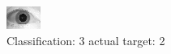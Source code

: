 \begin{figure}[h!]
\begin{center}
\includegraphics[width=0.60\columnwidth]{figures/ID1739_class_3_target_2.png}
\end{center}
\caption{ Classification: 3 actual target: 2}
\label{fig:ID1739_class_3_target_2}
\end{figure}
